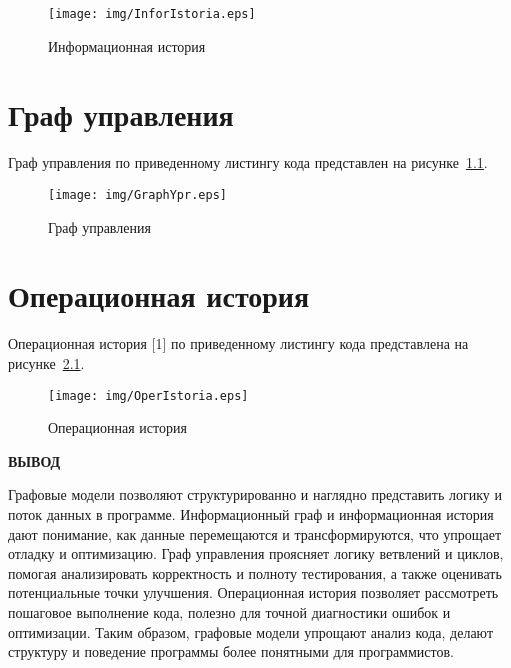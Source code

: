 \begin{figure}[h!]
	\centering
	\texttt{[image: img/InforIstoria.eps]}
	\caption{Информационная история}
	\label{fig:II}
\end{figure}

\chapter{Граф управления}

Граф управления по приведенному листингу кода представлен на рисунке~\ref{fig:GY}.

\begin{figure}[h!]
	\centering
	\texttt{[image: img/GraphYpr.eps]}
	\caption{Граф управления}
	\label{fig:GY}
\end{figure}

\chapter{Операционная история}

Операционная история [1] по приведенному листингу кода представлена на рисунке~\ref{fig:OI}.

\begin{figure}[h!]
	\centering
	\texttt{[image: img/OperIstoria.eps]}
	\caption{Операционная история}
	\label{fig:OI}
\end{figure}

\vspace{5mm}

\textbf{ВЫВОД}

Графовые модели позволяют структурированно и наглядно представить логику и поток данных в программе. Информационный граф и информационная история дают понимание, как данные перемещаются и трансформируются, что упрощает отладку и оптимизацию. Граф управления проясняет логику ветвлений и циклов, помогая анализировать корректность и полноту тестирования, а также оценивать потенциальные точки улучшения. Операционная история позволяет рассмотреть пошаговое выполнение кода, полезно для точной диагностики ошибок и оптимизации. Таким образом, графовые модели упрощают анализ кода, делают структуру и поведение программы более понятными для программистов.
